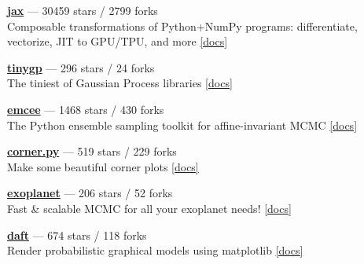 \item \href{https://github.com/jax-ml/jax}{{\bf jax}} --- 30459 stars / 2799 forks \\
Composable transformations of Python+NumPy programs: differentiate, vectorize, JIT to GPU/TPU, and more \href{http://jax.readthedocs.io/}{[docs]}

\item \href{https://github.com/dfm/tinygp}{{\bf tinygp}} --- 296 stars / 24 forks \\
The tiniest of Gaussian Process libraries \href{https://tinygp.readthedocs.io}{[docs]}

\item \href{https://github.com/dfm/emcee}{{\bf emcee}} --- 1468 stars / 430 forks \\
The Python ensemble sampling toolkit for affine-invariant MCMC \href{https://emcee.readthedocs.io}{[docs]}

\item \href{https://github.com/dfm/corner.py}{{\bf corner.py}} --- 519 stars / 229 forks \\
Make some beautiful corner plots \href{http://corner.readthedocs.io}{[docs]}

\item \href{https://github.com/exoplanet-dev/exoplanet}{{\bf exoplanet}} --- 206 stars / 52 forks \\
Fast {\&} scalable MCMC for all your exoplanet needs!  \href{https://docs.exoplanet.codes}{[docs]}

\item \href{https://github.com/daft-dev/daft}{{\bf daft}} --- 674 stars / 118 forks \\
Render probabilistic graphical models using matplotlib \href{https://docs.daft-pgm.org}{[docs]}